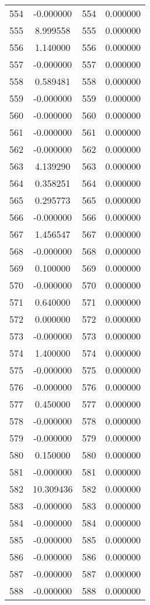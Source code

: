 \documentclass[12pt]{article}
\begin{document}
\begin{longtable}{@{}cccc@{}}
554 & -0.000000 & 554 & 0.000000 \\
555 & 8.999558 & 555 & 0.000000 \\
556 & 1.140000 & 556 & 0.000000 \\
557 & -0.000000 & 557 & 0.000000 \\
558 & 0.589481 & 558 & 0.000000 \\
559 & -0.000000 & 559 & 0.000000 \\
560 & -0.000000 & 560 & 0.000000 \\
561 & -0.000000 & 561 & 0.000000 \\
562 & -0.000000 & 562 & 0.000000 \\
563 & 4.139290 & 563 & 0.000000 \\
564 & 0.358251 & 564 & 0.000000 \\
565 & 0.295773 & 565 & 0.000000 \\
566 & -0.000000 & 566 & 0.000000 \\
567 & 1.456547 & 567 & 0.000000 \\
568 & -0.000000 & 568 & 0.000000 \\
569 & 0.100000 & 569 & 0.000000 \\
570 & -0.000000 & 570 & 0.000000 \\
571 & 0.640000 & 571 & 0.000000 \\
572 & 0.000000 & 572 & 0.000000 \\
573 & -0.000000 & 573 & 0.000000 \\
574 & 1.400000 & 574 & 0.000000 \\
575 & -0.000000 & 575 & 0.000000 \\
576 & -0.000000 & 576 & 0.000000 \\
577 & 0.450000 & 577 & 0.000000 \\
578 & -0.000000 & 578 & 0.000000 \\
579 & -0.000000 & 579 & 0.000000 \\
580 & 0.150000 & 580 & 0.000000 \\
581 & -0.000000 & 581 & 0.000000 \\
582 & 10.309436 & 582 & 0.000000 \\
583 & -0.000000 & 583 & 0.000000 \\
584 & -0.000000 & 584 & 0.000000 \\
585 & -0.000000 & 585 & 0.000000 \\
586 & -0.000000 & 586 & 0.000000 \\
587 & -0.000000 & 587 & 0.000000 \\
588 & -0.000000 & 588 & 0.000000 \\

\end{longtable}
\end{document}
